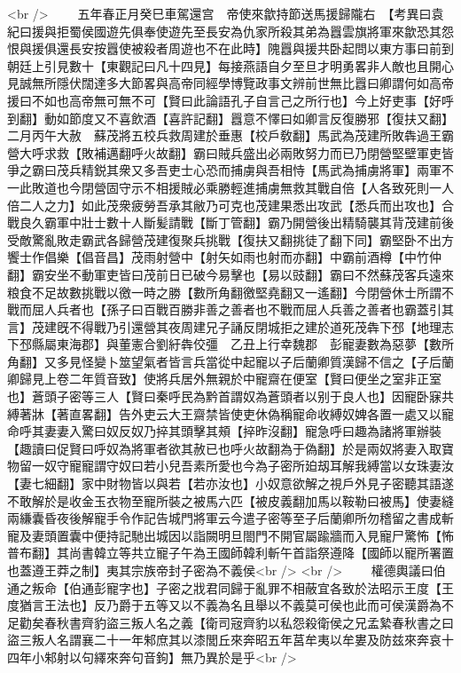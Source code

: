 <br />
　　五年春正月癸巳車駕還宫　帝使來歙持節送馬援歸隴右　【考異曰袁紀曰援與拒蜀侯國遊先俱奉使遊先至長安為仇家所殺其弟為囂雲旗將軍來歙恐其怨恨與援俱還長安按囂使被殺者周遊也不在此時】隗囂與援共卧起問以東方事曰前到朝廷上引見數十【東觀記曰凡十四見】每接燕語自夕至旦才明勇畧非人敵也且開心見誠無所隱伏闊達多大節畧與高帝同經學博覽政事文辨前世無比囂曰卿謂何如高帝援曰不如也高帝無可無不可【賢曰此論語孔子自言己之所行也】今上好吏事【好呼到翻】動如節度又不喜飲酒【喜許記翻】囂意不懌曰如卿言反復勝邪【復扶又翻】　二月丙午大赦　蘇茂將五校兵救周建於垂惠【校戶敎翻】馬武為茂建所敗犇過王霸營大呼求救【敗補邁翻呼火故翻】霸曰賊兵盛出必兩敗努力而已乃閉營堅壁軍吏皆爭之霸曰茂兵精鋭其衆又多吾吏士心恐而捕虜與吾相恃【馬武為捕虜將軍】兩軍不一此敗道也今閉營固守示不相援賊必乘勝輕進捕虜無救其戰自倍【人各致死則一人倍二人之力】如此茂衆疲勞吾承其敝乃可克也茂建果悉出攻武【悉兵而出攻也】合戰良久霸軍中壯士數十人斷髪請戰【斷丁管翻】霸乃開營後出精騎襲其背茂建前後受敵驚亂敗走霸武各歸營茂建復聚兵挑戰【復扶又翻挑徒了翻下同】霸堅卧不出方饗士作倡樂【倡音昌】茂雨射營中【射矢如雨也射而亦翻】中霸前酒樽【中竹仲翻】霸安坐不動軍吏皆曰茂前日已破今易擊也【易以豉翻】霸曰不然蘇茂客兵遠來粮食不足故數挑戰以徼一時之勝【數所角翻徼堅堯翻又一遙翻】今閉營休士所謂不戰而屈人兵者也【孫子曰百戰百勝非善之善者也不戰而屈人兵善之善者也霸蓋引其言】茂建旣不得戰乃引還營其夜周建兄子誦反閉城拒之建於道死茂犇下邳【地理志下邳縣屬東海郡】與董憲合劉紆犇佼彊　乙丑上行幸魏郡　彭寵妻數為惡夢【數所角翻】又多見怪變卜筮望氣者皆言兵當從中起寵以子后蘭卿質漢歸不信之【子后蘭卿歸見上卷二年質音致】使將兵居外無親於中寵齋在便室【賢曰便坐之室非正室也】蒼頭子密等三人【賢曰秦呼民為黔首謂奴為蒼頭者以别于良人也】因寵卧寐共縛著牀【著直畧翻】告外吏云大王齋禁皆使吏休偽稱寵命收縛奴婢各置一處又以寵命呼其妻妻入驚曰奴反奴乃捽其頭擊其頰【捽昨沒翻】寵急呼曰趣為諸將軍辦裝【趣讀曰促賢曰呼奴為將軍者欲其赦已也呼火故翻為于偽翻】於是兩奴將妻入取寶物留一奴守寵寵謂守奴曰若小兒吾素所愛也今為子密所廹刼耳解我縛當以女珠妻汝【妻七細翻】家中財物皆以與若【若亦汝也】小奴意欲解之視戶外見子密聽其語遂不敢解於是收金玉衣物至寵所裝之被馬六匹【被皮義翻加馬以鞍勒曰被馬】使妻縫兩縑囊昏夜後解寵手令作記告城門將軍云今遣子密等至子后蘭卿所勿稽留之書成斬寵及妻頭置囊中便持記馳出城因以詣闕明旦閤門不開官屬踰牆而入見寵尸驚怖【怖普布翻】其尚書韓立等共立寵子午為王國師韓利斬午首詣祭遵降【國師以寵所署置也蓋遵王莽之制】夷其宗族帝封子密為不義侯<br />
<br />
　　權德輿議曰伯通之叛命【伯通彭寵字也】子密之戕君同歸于亂罪不相蔽宜各致於法昭示王度【王度猶言王法也】反乃爵于五等又以不義為名且舉以不義莫可侯也此而可侯漢爵為不足勸矣春秋書齊豹盜三叛人名之義【衛司宼齊豹以私怨殺衛侯之兄孟縶春秋書之曰盜三叛人名謂襄二十一年邾庶其以漆閭丘來奔昭五年莒牟夷以牟婁及防兹來奔哀十四年小邾射以句繹來奔句音鉤】無乃異於是乎<br />
